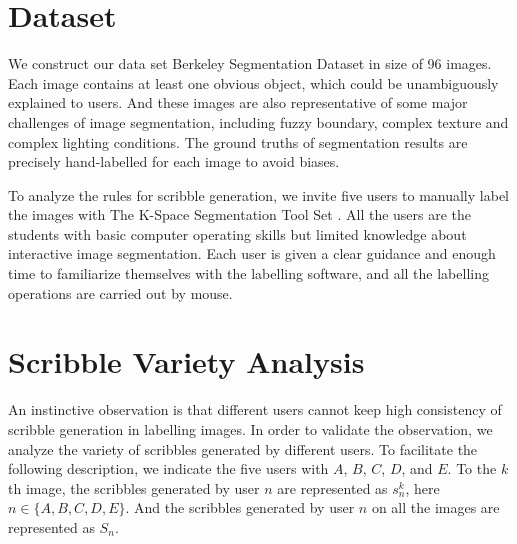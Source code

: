 \documentclass[runningheads,a4paper]{llncs}
\begin{document}
\section{Dataset}
We construct our data set Berkeley Segmentation Dataset \cite{martin2001database} in size of 96 images. Each image contains at least one obvious object, which could be unambiguously explained to users. And these images are also representative of some major challenges of image segmentation, including fuzzy boundary, complex texture and complex lighting conditions. The ground truths of segmentation results are precisely hand-labelled for each image to avoid biases.

To analyze the rules for scribble generation, we invite five users to manually label the images with The K-Space Segmentation Tool Set \cite{mcguinness2008k}. All the users are the students with basic computer operating skills but limited knowledge about interactive image segmentation. Each user is given a clear guidance and enough time to familiarize themselves with the labelling software, and all the labelling operations are carried out by mouse.


\section{Scribble Variety Analysis}

An instinctive observation is that different users cannot keep high consistency of scribble generation in labelling images. In order to validate the observation, we analyze the variety of scribbles generated by different users. To facilitate the following description, we indicate the five users with $A$, $B$, $C$, $D$, and $E$. To the $k$th image, the scribbles generated by user $n$ are represented as $s^{k}_{n}$, here $n\in \{A,B,C,D,E\}$. And the scribbles generated by user $n$ on all the images are represented as $S_{n}$.
\end{document}
